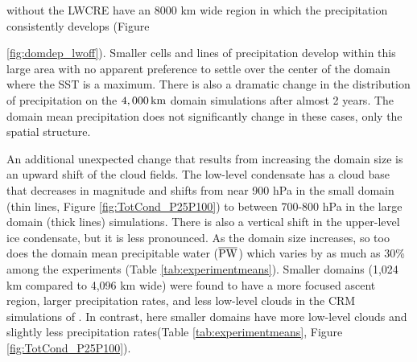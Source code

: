 \documentclass[draft]{agujournal2019}
\begin{document}
without the LWCRE have an 8000 km wide region in which the precipitation consistently develops (Figure {\ref{fig:domdep_lwoff}).  
Smaller cells and lines of precipitation develop within this large area with no apparent preference to settle
over the center of the domain where the SST is a maximum.  
There is also a dramatic change in the distribution of precipitation on the $4,000\, \rm{km}$ domain simulations after almost 2 years.   
The domain mean precipitation does not significantly change in these cases, only the spatial structure. 

An additional unexpected change that results from increasing the domain size is an upward shift of the cloud fields.  
The low-level condensate has a cloud base that decreases in magnitude and shifts from  near 900 hPa in the small domain (thin lines, Figure \ref{fig:TotCond_P25P100}) to between 700-800 hPa in 
the large domain (thick lines) simulations.
There is also a vertical shift in the upper-level ice condensate, but it is less pronounced.  
As the domain size increases, so too does the domain mean precipitable water ($\overline{\rm{PW}}$) which varies by as much as 30\% among the experiments (Table \ref{tab:experimentmeans}).   
Smaller domains (1,024 km compared to 4,096 km wide) were found to have a more focused ascent region, larger precipitation rates, and less low-level clouds in the CRM simulations of .
In contrast, here smaller domains have more low-level clouds and slightly less precipitation rates(Table \ref{tab:experimentmeans}, 
Figure \ref{fig:TotCond_P25P100}).     



}
\end{document}
